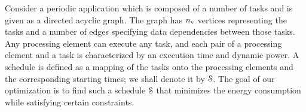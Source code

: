 Consider a periodic application which is composed of a number of tasks and is given as a directed acyclic graph.
The graph has ${n_\text{v}}$ vertices representing the tasks and a number of edges specifying data dependencies between those tasks.
Any processing element can execute any task, and each pair of a processing element and a task is characterized by an execution time and dynamic power.
A schedule is defined as a mapping of the tasks onto the processing elements and the corresponding starting times; we shall denote it by $\EuScript{S}$.
The goal of our optimization is to find such a schedule $\EuScript{S}$ that minimizes the energy consumption while satisfying certain constraints.

